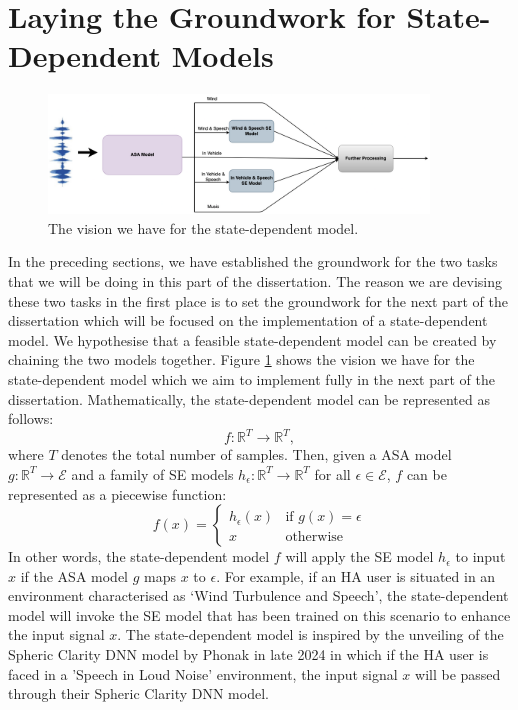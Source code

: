 \documentclass[logo,bsc,singlespacing,parskip,online]{infthesis}
\begin{document}
\section{Laying the Groundwork for State-Dependent Models}
\begin{figure}[h] \centering
   \includegraphics[width=0.9\textwidth]{state-model-diagram.png}
   \caption{The vision we have for the state-dependent model.}
   \label{fig:state-dependent-model}
\end{figure}
In the preceding sections, we have established the groundwork for the two tasks that we will be doing in this part of the dissertation.
The reason we are devising these two tasks in the first place is to set the groundwork for the next part of the dissertation which 
will be focused on the implementation of a state-dependent model. We hypothesise that a feasible state-dependent model can be created 
by chaining the two models together. Figure \ref{fig:state-dependent-model} shows the vision we have for the state-dependent model which we aim to implement fully in the next part of the dissertation.
Mathematically, the state-dependent model can be represented as follows:
\[
f: \mathbb{R}^{T} \to \mathbb{R}^{T},
\]
where \(T\) denotes the total number of samples. 
Then, given a ASA model $g : \mathbb{R}^{T} \to \mathcal{E}$ and a family of SE models $h_{\epsilon} : \mathbb{R}^{T} \to \mathbb{R}^{T}$ for all \(\epsilon \in \mathcal{E}\), 
$f$ can be represented as a piecewise function:
\begin{equation}
   f(x) = 
   \begin{cases} 
      h_{\epsilon}(x) & \text{if } g(x) = \epsilon \\
      x & \text{otherwise}
   \end{cases}
\end{equation}
In other words, the state-dependent model $f$ will apply the SE model $h_{\epsilon}$ to input $x$ if the ASA model $g$ maps $x$ to \(\epsilon\).
For example, if an HA user is situated in an environment characterised as `Wind Turbulence and Speech',
the state-dependent model will invoke the SE model that has been trained on this scenario to enhance the input signal $x$.
The state-dependent model is inspired by the unveiling of the Spheric Clarity DNN model by Phonak \citep{Hasemann2024PhonakSphere} in late 2024
in which if the HA user is faced in a 'Speech in Loud Noise' environment, the input signal $x$ will be passed through their Spheric Clarity DNN model.
\end{document}
